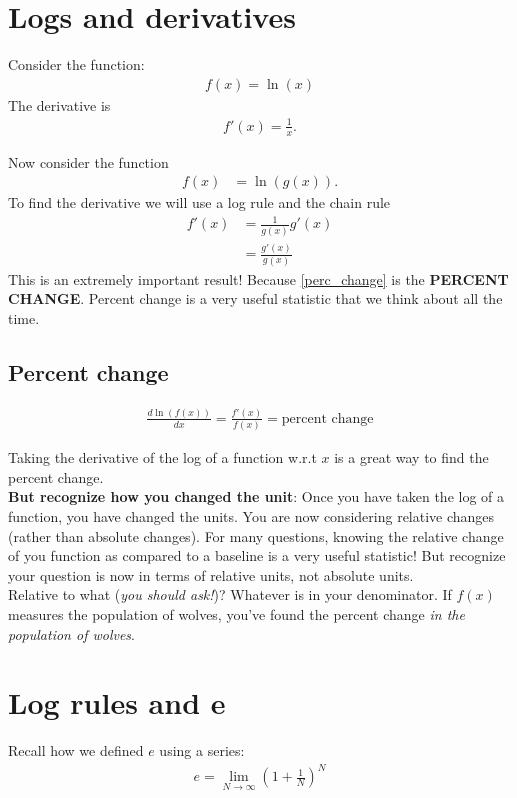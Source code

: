 \documentclass{article}
\begin{document}
\section{Logs and derivatives}
Consider the function: 
\begin{align}
    f(x) = \ln(x)
\end{align}
The derivative is 
\begin{align}
    f'(x) = \frac{1}{x}.
\end{align}

Now consider the function 
\begin{align}
    f(x) &= \ln(g(x)).
\end{align}
To find the derivative we will use a log rule and the chain rule 
\begin{align}
    f'(x) &= \frac{1}{g(x)} g'(x) \\
    &= \frac{g'(x)}{g(x)} \label{perc_change}
\end{align}
This is an extremely important result! Because \ref{perc_change}
is the \textbf{PERCENT CHANGE}. Percent change is a very useful statistic that we think about all the time. \\

\subsection{Percent change}

\begin{align}
    \frac{d \ln(f(x))}{dx} = \frac{f'(x)}{f(x)} = \text{percent change}
\end{align}

Taking the derivative of the log of a function w.r.t $x$ is a great way to find the percent change. \\

\textbf{But recognize how you changed the unit}: Once you have taken the log of a function, you have changed the units. You are now considering relative changes (rather than absolute changes). For many questions, knowing the relative change of you function as compared to a baseline is a very useful statistic! But recognize your question is now in terms of relative units, not absolute units. \\

Relative to what (\textit{you should ask!})? Whatever is in your denominator. If $f(x)$ measures the population of wolves, you've found the percent change \textit{in the population of wolves}.

\section{Log rules and e}
Recall how we defined $e$ using a series:
\begin{align}
    e = \lim_{N \to \infty} \left(1 + \frac{1}{N}\right)^N
\end{align}
\end{document}

